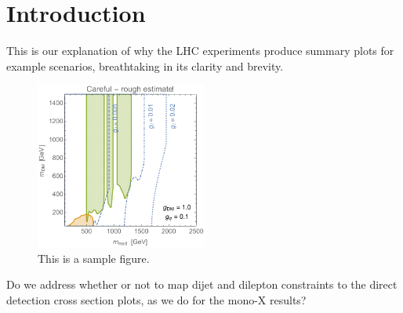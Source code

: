 \section{Introduction} 
\label{Plots}

This is our explanation of why the LHC experiments produce summary plots for example scenarios, breathtaking in its clarity and brevity.

\begin{figure}[h!]
    \centering
	\includegraphics[width=0.5\textwidth]{figures/mass-mass.pdf}
  \caption{This is a sample figure.}
    	\label{fig:DMComplementarity}
\end{figure}

Do we address whether or not to map dijet and dilepton constraints to the direct detection cross section plots, as we do for the mono-X results?

